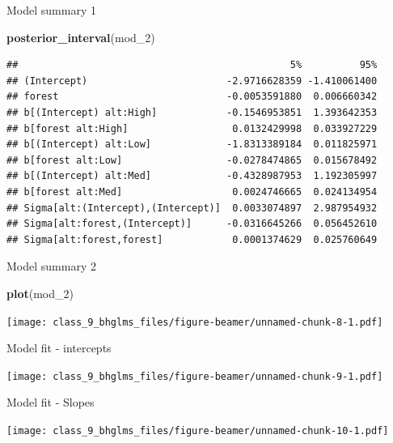 \documentclass[ignorenonframetext,]{beamer}
\newenvironment{Shaded}{\begin{snugshade}}{\end{snugshade}}
\newcommand{\KeywordTok}[1]{\textcolor[rgb]{0.13,0.29,0.53}{\textbf{#1}}}
\newcommand{\DecValTok}[1]{\textcolor[rgb]{0.00,0.00,0.81}{#1}}
\newcommand{\NormalTok}[1]{#1}
\begin{document}
\begin{frame}[fragile]{Model summary 1}

\tiny

\begin{Shaded}
\begin{Highlighting}[]
\KeywordTok{posterior_interval}\NormalTok{(mod_}\DecValTok{2}\NormalTok{)}
\end{Highlighting}
\end{Shaded}

\begin{verbatim}
##                                               5%          95%
## (Intercept)                        -2.9716628359 -1.410061400
## forest                             -0.0053591880  0.006660342
## b[(Intercept) alt:High]            -0.1546953851  1.393642353
## b[forest alt:High]                  0.0132429998  0.033927229
## b[(Intercept) alt:Low]             -1.8313389184  0.011825971
## b[forest alt:Low]                  -0.0278474865  0.015678492
## b[(Intercept) alt:Med]             -0.4328987953  1.192305997
## b[forest alt:Med]                   0.0024746665  0.024134954
## Sigma[alt:(Intercept),(Intercept)]  0.0033074897  2.987954932
## Sigma[alt:forest,(Intercept)]      -0.0316645266  0.056452610
## Sigma[alt:forest,forest]            0.0001374629  0.025760649
\end{verbatim}

\end{frame}

\begin{frame}[fragile]{Model summary 2}

\begin{Shaded}
\begin{Highlighting}[]
\KeywordTok{plot}\NormalTok{(mod_}\DecValTok{2}\NormalTok{)}
\end{Highlighting}
\end{Shaded}

\texttt{[image: class\_9\_bhglms\_files/figure-beamer/unnamed-chunk-8-1.pdf]}

\end{frame}

\begin{frame}{Model fit - intercepts}

\texttt{[image: class\_9\_bhglms\_files/figure-beamer/unnamed-chunk-9-1.pdf]}

\end{frame}

\begin{frame}{Model fit - Slopes}

\texttt{[image: class\_9\_bhglms\_files/figure-beamer/unnamed-chunk-10-1.pdf]}

\end{frame}
\end{document}
